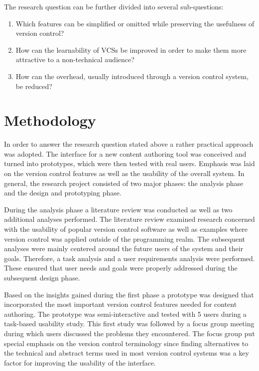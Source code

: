 \noindent %
The research question can be further divided into several sub-questions:

\begin{enumerate}
  \item Which features can be simplified or omitted while  preserving the usefulness of version control?
  \item How can the learnability of VCSs be improved in order to make them more attractive to a non-technical audience?
  \item How can the overhead, usually introduced through a version control system, be reduced?
\end{enumerate}

\section{Methodology}
In order to answer the research question stated above a rather practical approach was adopted. The interface for a new content authoring tool was conceived and turned into prototypes, which were then tested with real users. Emphasis was laid on the version control features as well as the usability of the overall system. In general, the research project consisted of two major phases: the analysis phase and the design and prototyping phase.

During the analysis phase a literature review was conducted as well as two additional analyses performed. The literature review examined research concerned with the usability of popular version control software as well as examples where version control was applied outside of the programming realm. The subsequent analyses were mainly centered around the future users of the system and their goals. Therefore, a task analysis and a user requirements analysis were performed. These ensured that user needs and goals were properly addressed during the subsequent design phase.

Based on the insights gained during the first phase a prototype was designed that incorporated the most important version control features needed for content authoring. The prototype was semi-interactive and tested with 5 users during a task-based usability study. This first study was followed by a focus group meeting during which users discussed the problems they encountered. The focus group put special emphasis on the version control terminology since finding alternatives to the technical and abstract terms used in most version control systems was a key factor for improving the usability of the interface.

